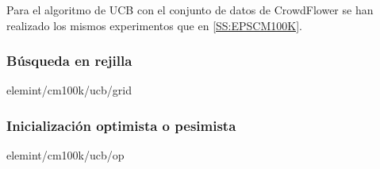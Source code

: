 Para el algoritmo de UCB con el conjunto de datos de CrowdFlower se han realizado los mismos experimentos que en \ref{SS:EPSCM100K}.
\subsubsection{Búsqueda en rejilla}{elemint/cm100k/ucb/grid}

\subsubsection{Inicialización optimista o pesimista}{elemint/cm100k/ucb/op}
